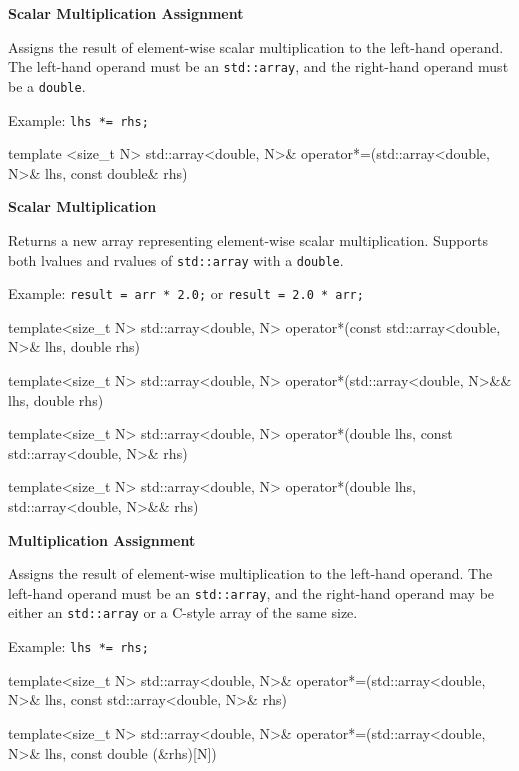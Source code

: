 \documentclass[11pt,fleqn]{report}
\begin{document}
\textbf{Scalar Multiplication Assignment}  

Assigns the result of element-wise scalar multiplication to the left-hand operand.
The left-hand operand must be an \texttt{std::array}, and the right-hand 
operand must be a \texttt{double}.

Example: \texttt{lhs *= rhs;} 
\begin{code}
template <size_t N>
std::array<double, N>& operator*=(std::array<double, N>& lhs, 
                                  const double& rhs)
\end{code}

\textbf{Scalar Multiplication}  

Returns a new array representing element-wise scalar multiplication.  
Supports both lvalues and rvalues of \texttt{std::array} with a \texttt{double}.

Example: \texttt{result = arr * 2.0;} or \texttt{result = 2.0 * arr;}  
\begin{code}
template<size_t N>
std::array<double, N> operator*(const std::array<double, N>& lhs, 
                                double rhs)
                                
template<size_t N>
std::array<double, N> operator*(std::array<double, N>&& lhs, 
                                double rhs)

template<size_t N>
std::array<double, N> operator*(double lhs, 
                                const std::array<double, N>& rhs)

template<size_t N>
std::array<double, N> operator*(double lhs, 
                                std::array<double, N>&& rhs)
\end{code}

\textbf{Multiplication Assignment}  

Assigns the result of element-wise multiplication to the left-hand operand.
The left-hand operand must be an \texttt{std::array}, and the right-hand 
operand may be either an \texttt{std::array} or a C-style array 
of the same size.

Example: \texttt{lhs *= rhs;}  
\begin{code}
template<size_t N>
std::array<double, N>& operator*=(std::array<double, N>& lhs, 
                                  const std::array<double, N>& rhs)

template<size_t N>
std::array<double, N>& operator*=(std::array<double, N>& lhs, 
                                  const double (&rhs)[N])
\end{code}
\end{document}

